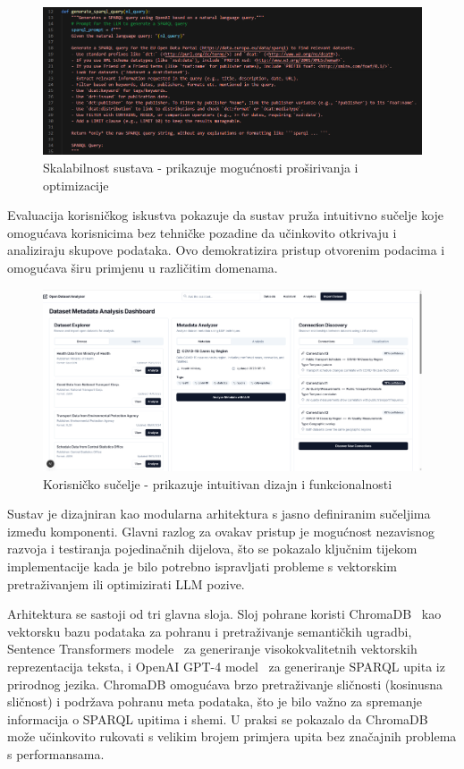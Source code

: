 \begin{figure}[htbp]
    \centering
    \includegraphics[width=1\textwidth]{figures/izvjestaj_image_13.png}
    \caption{Skalabilnost sustava - prikazuje mogućnosti proširivanja i optimizacije}
    \label{fig:system_scalability}
\end{figure}

Evaluacija korisničkog iskustva pokazuje da sustav pruža intuitivno sučelje koje omogućava korisnicima bez tehničke pozadine da učinkovito otkrivaju i analiziraju skupove podataka. Ovo demokratizira pristup otvorenim podacima i omogućava širu primjenu u različitim domenama.

\begin{figure}[htbp]
    \centering
    \includegraphics[width=1\textwidth]{figures/izvjestaj_image_4.png}
    \caption{Korisničko sučelje - prikazuje intuitivan dizajn i funkcionalnosti}
    \label{fig:user_interface}
\end{figure}

Sustav je dizajniran kao modularna arhitektura s jasno definiranim sučeljima između komponenti. Glavni razlog za ovakav pristup je mogućnost nezavisnog razvoja i testiranja pojedinačnih dijelova, što se pokazalo ključnim tijekom implementacije kada je bilo potrebno ispravljati probleme s vektorskim pretraživanjem ili optimizirati LLM pozive.

Arhitektura se sastoji od tri glavna sloja. Sloj pohrane koristi ChromaDB~\cite{wang2023vector} kao vektorsku bazu podataka za pohranu i pretraživanje semantičkih ugradbi, Sentence Transformers modele~\cite{reimers2019sentence} za generiranje visokokvalitetnih vektorskih reprezentacija teksta, i OpenAI GPT-4 model~\cite{brown2020language} za generiranje SPARQL upita iz prirodnog jezika. ChromaDB omogućava brzo pretraživanje sličnosti (kosinusna sličnost) i podržava pohranu meta podataka, što je bilo važno za spremanje informacija o SPARQL upitima i shemi. U praksi se pokazalo da ChromaDB može učinkovito rukovati s velikim brojem primjera upita bez značajnih problema s performansama.

